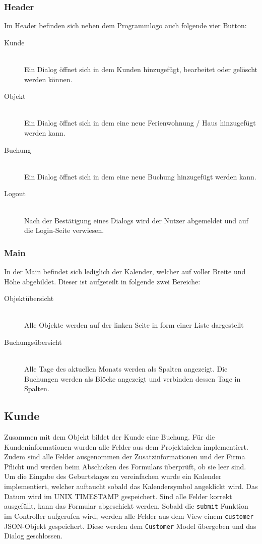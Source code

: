 \subsubsection{Header}
Im Header befinden sich neben dem Programmlogo auch folgende vier Button:
\begin{description}
\item[Kunde]\hfill \\
Ein Dialog öffnet sich in dem Kunden hinzugefügt, bearbeitet oder gelöscht werden können.
\item[Objekt]\hfill \\ 
Ein Dialog öffnet sich in dem eine neue Ferienwohnung / Haus hinzugefügt werden kann. 
\item[Buchung]\hfill \\ 
Ein Dialog öffnet sich in dem eine neue Buchung hinzugefügt werden kann. 
\item[Logout]\hfill \\ 
Nach der Bestätigung eines Dialogs wird der Nutzer abgemeldet und auf die Login-Seite verwiesen. 
\end{description}

\subsubsection{Main}
In der Main befindet sich lediglich der Kalender, welcher auf voller Breite und Höhe abgebildet. 
Dieser ist aufgeteilt in folgende zwei Bereiche:
\begin{description}
\item[Objektübersicht]\hfill \\
Alle Objekte werden auf der linken Seite in form einer Liste dargestellt
\item[Buchungsübersicht]\hfill \\ 
Alle Tage des aktuellen Monats werden als Spalten angezeigt. Die Buchungen werden als Blöcke angezeigt und verbinden dessen Tage in Spalten.  
\end{description}

\subsection{Kunde}
Zusammen mit dem Objekt bildet der Kunde eine Buchung. Für die Kundeninformationen wurden alle Felder aus dem Projektzielen implementiert. Zudem sind alle Felder ausgenommen der Zusatzinformationen und der Firma Pflicht und werden beim Abschicken des Formulars überprüft, ob sie leer sind. Um die Eingabe des Geburtstages zu vereinfachen wurde ein Kalender implementiert, welcher auftaucht sobald das Kalendersymbol angeklickt wird. Das Datum wird im UNIX TIMESTAMP gespeichert. Sind alle Felder korrekt ausgefüllt, kann das Formular abgeschickt werden. Sobald die \texttt{submit} Funktion im Controller aufgerufen wird, werden alle Felder aus dem View einem \texttt{customer} JSON-Objekt gespeichert. Diese werden dem \texttt{Customer} Model übergeben und das Dialog geschlossen. 

